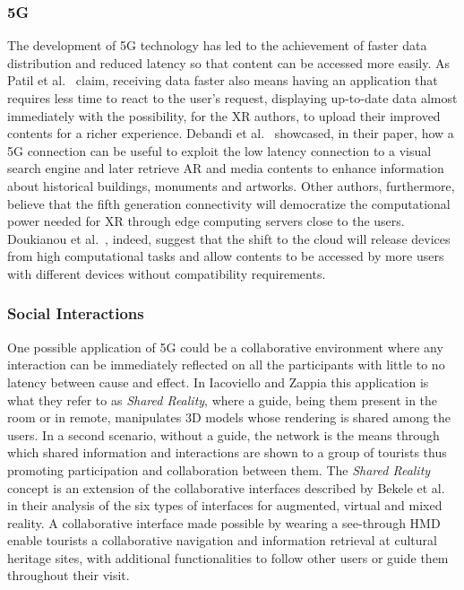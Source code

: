 \subsubsection{5G}
The development of 5G technology has led to the achievement of faster data distribution and reduced latency so that content can be accessed more easily. As Patil et al.~\cite{patil_accelerating_2019} claim, receiving data faster also means having an application that requires less time to react to the user’s request, displaying up-to-date data almost immediately with the possibility, for the XR authors, to upload their improved contents for a richer experience. Debandi et al.~\cite{debandi_enhancing_2018} showcased, in their paper, how a 5G connection can be useful to exploit the low latency connection to a visual search engine and later retrieve AR and media contents to enhance information about historical buildings, monuments and artworks.
Other authors, furthermore, believe that the fifth generation connectivity will democratize the computational power needed for XR through edge computing servers close to the users. Doukianou et al.~\cite{doukianou_beyond_2020}, indeed, suggest that the shift to the cloud will release devices from high computational tasks and allow contents to be accessed by more users with different devices without compatibility requirements.

\subsubsection{Social Interactions}
One possible application of 5G could be a collaborative environment where any interaction can be immediately reflected on all the participants with little to no latency between cause and effect. In Iacoviello and Zappia \cite{iacoviello_holocities_2020} this application is what they refer to as \textit{Shared Reality}, where a guide, being them present in the room or in remote, manipulates 3D models whose rendering is shared among the users. In a second scenario, without a guide, the network is the means through which shared information and interactions are shown to a group of tourists thus promoting participation and collaboration between them. The \textit{Shared Reality} concept is an extension of the collaborative interfaces described by Bekele et al.~\cite{bekele_survey_2018} in their analysis of the six types of interfaces for augmented, virtual and mixed reality. A collaborative interface made possible by wearing a see-through \gls{HMD} enable tourists a collaborative navigation and information retrieval at cultural heritage sites, with additional functionalities to follow other users or guide them throughout their visit.

